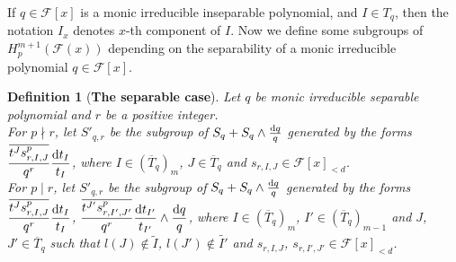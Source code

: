 \documentclass[times,10pt]{amsart}
\newcommand{\dd}{{\rm d}}
\newcommand{\F}{\ensuremath{\mathcal{F}}}
\newtheorem{defn}[thm]{Definition}%
\begin{document}
   {If $q\in \F[x]$ is  a monic irreducible   inseparable  polynomial,   and $I\in T_q$, then} the notation $I_x$ denotes    $x$-th component   of $I$.  Now we define   some subgroups of  $H_p^{m+1}(\F(x))$ depending on  the separability of a monic irreducible polynomial $q\in \F[x]$.

   \begin{defn}[\textbf{The separable case}]\label{d1f} Let $q$ be {monic irreducible separable polynomial} and $r$ be a positive integer.\\
    For $ p\nmid r$, {let $S'_{q,r}$ be the subgroup of}  $S_q+ S_q\wedge \frac{\dd q}{q}$  generated by the forms  $\displaystyle{ \frac{\overline{t^J s^p_{r,I,J}}}{q^r}\frac{\dd t_I}{t_I}}$, where $ I\in (\overline{T}_q)_m$, $J\in \overline{T}_q$ and $s_{r,I,J}\in \F[x]_{<d}$.\\

    For  {$p\mid r$,  let $ S'_{q,r}$ be the subgroup of} $S_q+ S_q\wedge \frac{\dd q}{q}$ generated by the forms    $ \displaystyle{\frac{\overline{t^J s^p_{r,I,J}}}{q^r}\frac{\dd t_I}{t_I}}$, $\displaystyle{\frac{ \overline{t^{J'} s^p_{r,I',J'}}}{q^r} \frac{\dd t_{I'}}{t_{I'}}\wedge \frac{\dd q}{q}}$,  where $ I\in (\overline{T}_q)_m$, $I'\in (\overline{T}_q)_{m-1}$ and $J$, $J'\in \overline{T}_q$ such that $ l(J)\notin \tilde{I}$, $l(J')\notin \tilde{I'}$ and  $s_{r,I,J}$,  $s_{r,I',J'}\in \F[x]_{<d}$. 
        \end{defn}
\medskip
\end{document}
